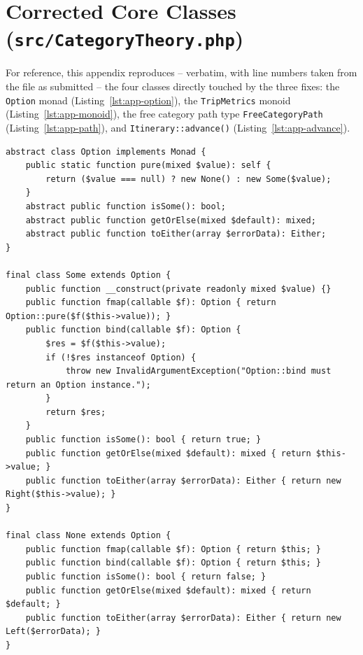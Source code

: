 \section{Corrected Core Classes (\texttt{src/CategoryTheory.php})}\label{app:src}

\lstset{xleftmargin=32pt, framexleftmargin=24pt, numbersep=5pt}

For reference, this appendix reproduces -- verbatim, with line numbers taken from the file as submitted -- the four classes directly touched by the three fixes: the \texttt{Option} monad (Listing~\ref{lst:app-option}), the \texttt{TripMetrics} monoid (Listing~\ref{lst:app-monoid}), the free category path type \texttt{FreeCategoryPath} (Listing~\ref{lst:app-path}), and \texttt{Itinerary::advance()} (Listing~\ref{lst:app-advance}).

\begin{lstlisting}[caption={\texttt{Option}, \texttt{Some}, \texttt{None} -- fixed \texttt{pure}},label={lst:app-option},firstnumber=27]
abstract class Option implements Monad {
    public static function pure(mixed $value): self {
        return ($value === null) ? new None() : new Some($value);
    }
    abstract public function isSome(): bool;
    abstract public function getOrElse(mixed $default): mixed;
    abstract public function toEither(array $errorData): Either;
}

final class Some extends Option {
    public function __construct(private readonly mixed $value) {}
    public function fmap(callable $f): Option { return Option::pure($f($this->value)); }
    public function bind(callable $f): Option {
        $res = $f($this->value);
        if (!$res instanceof Option) {
            throw new InvalidArgumentException("Option::bind must return an Option instance.");
        }
        return $res;
    }
    public function isSome(): bool { return true; }
    public function getOrElse(mixed $default): mixed { return $this->value; }
    public function toEither(array $errorData): Either { return new Right($this->value); }
}

final class None extends Option {
    public function fmap(callable $f): Option { return $this; }
    public function bind(callable $f): Option { return $this; }
    public function isSome(): bool { return false; }
    public function getOrElse(mixed $default): mixed { return $default; }
    public function toEither(array $errorData): Either { return new Left($errorData); }
}
\end{lstlisting}

